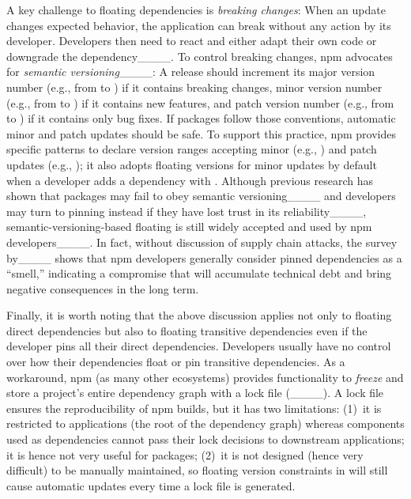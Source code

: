 A key challenge to floating dependencies is \textit{breaking changes}: When an update changes expected behavior, the application can break without any action by its developer. Developers then need to react and either adapt their own code or downgrade the dependency____.
To control breaking changes, npm advocates for \emph{semantic versioning}____: A release should increment its major version number (e.g., from  to ) if it contains breaking changes, minor version number (e.g., from  to ) if it contains new features, and patch version number (e.g., from  to ) if it contains only bug fixes. If packages follow those conventions, automatic minor and patch updates should be safe. 
To support this practice, npm provides specific patterns to declare version ranges accepting minor (e.g., ) and patch updates (e.g., ); it also adopts floating versions for minor updates by default when a developer adds a dependency with  .
Although previous research has shown that 
packages may fail to obey semantic versioning____ and developers may turn to pinning instead if they have lost trust in its reliability____,
 semantic-versioning-based floating is still widely accepted and used by npm developers____.
In fact, without discussion of supply chain attacks, the survey by____ shows that npm developers generally consider pinned dependencies as a ``smell,'' indicating a compromise that will accumulate technical debt and bring negative consequences in the long term.

Finally, it is worth noting that the above discussion applies not only to floating direct dependencies but also to floating transitive dependencies even if the developer pins all their direct dependencies.
Developers usually have no control over how their dependencies float or pin transitive dependencies.
As a workaround, npm (as many other ecosystems) provides functionality to \textit{freeze} and store a project's entire dependency graph with a lock file (____). %
A lock file ensures the reproducibility of npm builds, but
it has two limitations: (1)~it is restricted to applications (the root of the dependency graph) whereas components used as dependencies cannot pass their lock decisions to downstream applications; it is hence not very useful for packages; (2)~it is not designed (hence very difficult) to be manually maintained, so floating version constraints in  will still cause automatic updates every time a lock file is generated.

